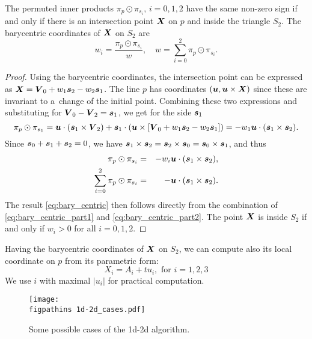 \begin{lemma}
\label{lemma_barycentric}
The permuted inner products $\pi_p \odot \pi_{s_i},\, i=0,1,2$ have the same non-zero sign if and only if there
is an intersection point $\mathbf{\boldsymbol{X}}$ on $p$ and inside the triangle $S_2$. 
The barycentric coordinates of $\mathbf{\boldsymbol{X}}$ on $S_2$ are
\begin{equation}
  \label{eq:bary_centric}
   w_i = \frac{\pi_p \odot \pi_{s_i}}{w},\quad w=\sum_{i=0}^{2} \pi_p \odot \pi_{s_i}.
\end{equation}
\end{lemma}
\begin{proof}
Using the barycentric coordinates, the intersection point can be expressed as $\mathbf{\boldsymbol{X}} = \mathbf{\boldsymbol{V}}_0 + w_1 \mathbf{\boldsymbol{s}}_2 - w_2 \mathbf{\boldsymbol{s}}_1$.
The line $p$ has \plucker coordinates $(\mathbf{\boldsymbol{u}}, \mathbf{\boldsymbol{u}} \times \mathbf{\boldsymbol{X}})$ since these are invariant to a~change of the initial point. 
Combining these two expressions and substituting for $\mathbf{\boldsymbol{V}}_0-\mathbf{\boldsymbol{V}}_2=\mathbf{\boldsymbol{s}}_1$, we get for the side $\mathbf{\boldsymbol{s}}_1$
\[
   \pi_p \odot \pi_{s_1} = \mathbf{\boldsymbol{u}} \cdot (\mathbf{\boldsymbol{s}}_1 \times \mathbf{\boldsymbol{V}}_2) + \mathbf{\boldsymbol{s}}_1 \cdot ( \mathbf{\boldsymbol{u}} \times [\mathbf{\boldsymbol{V}}_0 + w_1\mathbf{\boldsymbol{s}}_2 - w_2 \mathbf{\boldsymbol{s}}_1])
   =-w_1 \mathbf{\boldsymbol{u}} \cdot (\mathbf{\boldsymbol{s}}_1 \times \mathbf{\boldsymbol{s}}_2).
\]
Since $\mathbf{\boldsymbol{s}}_0 + \mathbf{\boldsymbol{s}}_1 + \mathbf{\boldsymbol{s}}_2=0$, we have $ \mathbf{\boldsymbol{s}}_1 \times \mathbf{\boldsymbol{s}}_2 = \mathbf{\boldsymbol{s}}_2 \times \mathbf{\boldsymbol{s}}_0 = \mathbf{\boldsymbol{s}}_0 \times \mathbf{\boldsymbol{s}}_1$, and thus
\begin{eqnarray}
   \pi_p \odot \pi_{s_i} &=& -w_i \mathbf{\boldsymbol{u}} \cdot (\mathbf{\boldsymbol{s}}_1 \times \mathbf{\boldsymbol{s}}_2), \label{eq:bary_centric_part1}\\
   \sum_{i=0}^{2} \pi_p \odot \pi_{s_i} &=& - \mathbf{\boldsymbol{u}} \cdot (\mathbf{\boldsymbol{s}}_1 \times \mathbf{\boldsymbol{s}}_2). \label{eq:bary_centric_part2}
\end{eqnarray}
The result \eqref{eq:bary_centric} then follows directly from the combination of \eqref{eq:bary_centric_part1} and \eqref{eq:bary_centric_part2}.
The point $\mathbf{\boldsymbol{X}}$ is inside $S_2$ if and only if $w_i>0$ for all $i=0,1,2$.
\end{proof}
Having the barycentric coordinates of $\mathbf{\boldsymbol{X}}$ on $S_2$, we can compute also its local coordinate on $p$ from its parametric form:
\begin{equation}
   \label{eq:line}
   X_i  = A_i + t u_i, \text{ for } i=1,2,3
\end{equation}
We use $i$ with maximal $|u_i|$ for practical computation. 

\begin{figure}[!htb]
    \centering
    \texttt{[image: \\figpathins 1d-2d\_cases.pdf]}
    \caption{Some possible cases of the 1d-2d algorithm.}
    \label{fig:1d2d_cases}
\end{figure}

